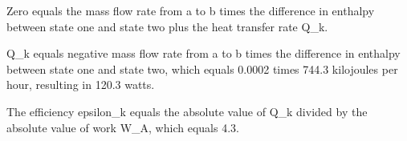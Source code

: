 Zero equals the mass flow rate from a to b times the difference in enthalpy between state one and state two plus the heat transfer rate Q_k.

Q_k equals negative mass flow rate from a to b times the difference in enthalpy between state one and state two, which equals 0.0002 times 744.3 kilojoules per hour, resulting in 120.3 watts.

The efficiency epsilon_k equals the absolute value of Q_k divided by the absolute value of work W_A, which equals 4.3.